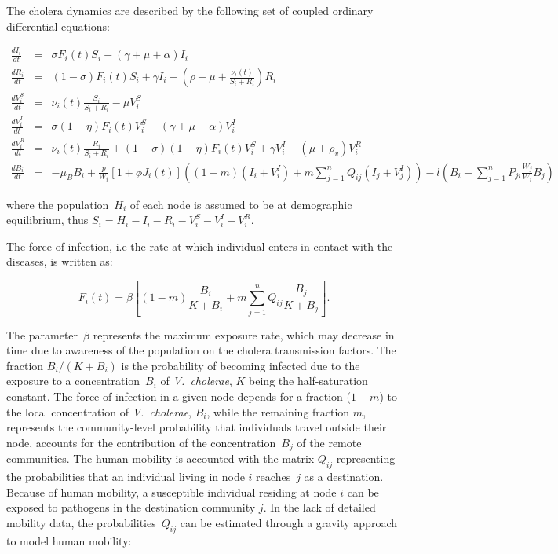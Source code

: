 The cholera dynamics are described by the following set of coupled ordinary differential equations:
\begin{fullwidth}

\begingroup
\allowdisplaybreaks
\begin{eqnarray}
\frac{dI_i}{dt} &=& \sigma F_i(t) S_i - (\gamma + \mu + \alpha) I_i \label{eq:I2}\\
\frac{dR_i}{dt} &=& (1-\sigma) F_i(t) S_i + \gamma I_i - (\rho + \mu+\frac{\nu_i(t)}{S_i+R_i}) R_i \label{eq:R2}\\
\frac{dV^S_i}{dt} &=& \nu_i(t) \frac{S_i}{S_i+R_i}-\mu V^S_i \label{eq:VS2}\\
\frac{dV^I_i}{dt} &=& \sigma (1-\eta) F_i(t) V^S_i - (\gamma + \mu + \alpha) V^I_i \label{eq:VI2}\\
\frac{dV^R_i}{dt} &=& \nu_i(t) \frac{R_i}{S_i+R_i} + (1-\sigma) (1-\eta) F_i(t) V^S_i + \gamma V^I_i - (\mu+\rho_v) V^R_i \label{eq:VR2}\\
\frac{dB_i}{dt} &=& - \mu_B B_i +\frac{p}{W_i}\left[1 + \phi J_i(t) \right] \left((1-m)(I_i +V_i^I)+m \sum_{j=1}^n Q_{ij} (I_j +V_j^I)\right)-  l \left( B_i - \sum_{j=1}^n P_{ji} \frac{W_j}{W_i} B_j \right)
\end{eqnarray}
\endgroup
\end{fullwidth}
where the population~$H_i$ of each node is assumed to be at demographic equilibrium, thus $S_i=H_i-I_i-R_i-V_i^S-V_i^I-V_i^R$.

The force of infection, i.e the rate at which individual enters in contact with the diseases, is written as:

\begin{equation}
F_i(t) = \beta \left[ (1 - m) \frac{B_i}{K + B_i} + m \sum_{j=1}^n Q_{ij} \frac{B_j}{K + B_j} \right].
\label{force}
\end{equation}

The parameter~$\beta$ represents the maximum exposure rate, which may decrease in time due to awareness of the population on the cholera transmission factors\cite{Bertuzzo:ProbabilityExtinctionHaiti:2016}. The fraction $B_{i}/(K+B_{i})$ is the probability of becoming infected due to the exposure to a concentration~$B_i$ of \textit{V.~cholerae}, $K$ being the half-saturation constant\cite{Codeco:EndemicEpidemicDynamics:2001}. The force of infection in a given node depends for a fraction ($1-m$) to the local concentration of \textit{V.~cholerae}, $B_i$, while the remaining fraction $m$, represents the community-level probability that individuals travel outside their node, accounts for the contribution of the concentration~$B_j$ of the remote communities. 
The human mobility is accounted with the matrix $Q_{ij}$ representing the probabilities that an individual living in node $i$ reaches~$j$ as a destination. Because of human mobility, a susceptible individual residing at node $i$ can be exposed to pathogens in the destination community $j$. 
In the lack of detailed mobility data,  the probabilities~$Q_{ij}$ can be estimated through a gravity approach\cite{Erlander:GravityModelTransportation:1990} to model human mobility:

